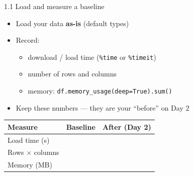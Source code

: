 \documentclass[aspectratio=43,11pt]{beamer}
\begin{document}
\begin{frame}{1.1 Load and measure a baseline}
  \begin{itemize}
    \item Load your data \textbf{as-is} (default types)
    \item Record:
      \begin{itemize}
        \item download / load time (\texttt{\%time} or \texttt{\%timeit})
        \item number of rows and columns
        \item memory: \texttt{df.memory\_usage(deep=True).sum()}
      \end{itemize}
    \item Keep these numbers --- they are your ``before'' on Day 2
  \end{itemize}
  \vspace{0.8em}
  \begin{center}
  \begin{tabular}{@{}lll@{}}
    \toprule
    Measure & Baseline & After (Day 2) \\
    \midrule
    Load time (s) & & \\
    Rows $\times$ columns & & \\
    Memory (MB) & & \\
    \bottomrule
  \end{tabular}
  \end{center}
\end{frame}
\end{document}
